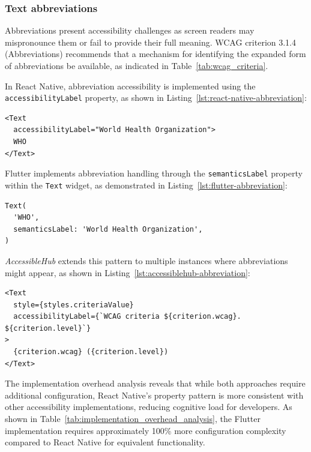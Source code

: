 \subsubsection{Text abbreviations}
\label{subsubsec:text-abbreviations}

Abbreviations present accessibility challenges as screen readers may mispronounce them or fail to provide their full meaning. WCAG criterion 3.1.4 (Abbreviations) recommends that a mechanism for identifying the expanded form of abbreviations be available, as indicated in Table~\ref{tab:wcag_criteria}.

In React Native, abbreviation accessibility is implemented using the \texttt{accessibilityLabel} property, as shown in Listing~\ref{lst:react-native-abbreviation}:

\begin{lstlisting}[style=ReactNativeStyle, caption=Abbreviation handling in React Native, label=lst:react-native-abbreviation]
<Text
  accessibilityLabel="World Health Organization">
  WHO
</Text>
\end{lstlisting}

Flutter implements abbreviation handling through the \texttt{semanticsLabel} property within the \texttt{Text} widget, as demonstrated in Listing~\ref{lst:flutter-abbreviation}:

\begin{lstlisting}[style=DartStyle, caption=Abbreviation handling in Flutter, label=lst:flutter-abbreviation]
Text(
  'WHO',
  semanticsLabel: 'World Health Organization',
)
\end{lstlisting}

\textit{AccessibleHub} extends this pattern to multiple instances where abbreviations might appear, as shown in Listing~\ref{lst:accessiblehub-abbreviation}:

\begin{lstlisting}[style=ReactNativeStyle, caption=Enhanced abbreviation handling in AccessibleHub, label=lst:accessiblehub-abbreviation]
<Text
  style={styles.criteriaValue}
  accessibilityLabel={`WCAG criteria ${criterion.wcag}. ${criterion.level}`}
>
  {criterion.wcag} ({criterion.level})
</Text>
\end{lstlisting}

The implementation overhead analysis reveals that while both approaches require additional configuration, React Native's property pattern is more consistent with other accessibility implementations, reducing cognitive load for developers. As shown in Table~\ref{tab:implementation_overhead_analysis}, the Flutter implementation requires approximately 100\% more configuration complexity compared to React Native for equivalent functionality.

